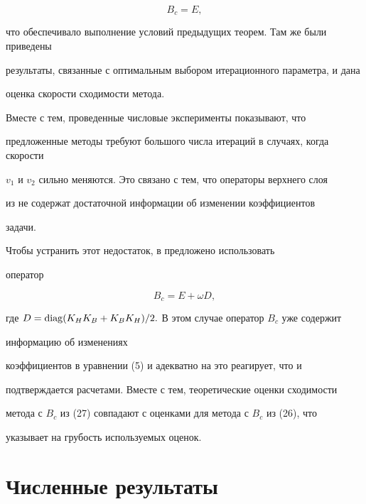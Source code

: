 \begin{equation} 


B_c=E, 


\end{equation} 


что обеспечивало выполнение условий предыдущих теорем. Там же были приведены 


результаты, связанные с оптимальным выбором итерационного параметра, и дана 


оценка скорости сходимости метода. 


 


Вместе с тем, проведенные числовые эксперименты показывают, что 


предложенные методы требуют большого числа итераций в случаях, когда скорости 


$v_1$ и $v_2$ сильно меняются. Это связано с тем, что операторы верхнего слоя 


из \cite{Kru3} не содержат достаточной информации об изменении коэффициентов 


задачи. 


 


Чтобы устранить этот недостаток, в \cite{Kru4} предложено использовать 


оператор 


\begin{equation} 


B_c = E+\omega D, 


\end{equation} 


где $D=\operatorname{diag}(K_H K_B+K_B K_H)/2.$ В этом случае оператор $B_c$ уже содержит 


информацию об изменениях 


коэффициентов в уравнении (5) и адекватно на это реагирует, что и 


подтверждается расчетами. Вместе с тем, теоретические оценки сходимости 


метода с $B_c$ из (27) совпадают с оценками для метода с $B_c$ из (26), что 


указывает на грубость используемых оценок. 


 


\section{Численные результаты} 


